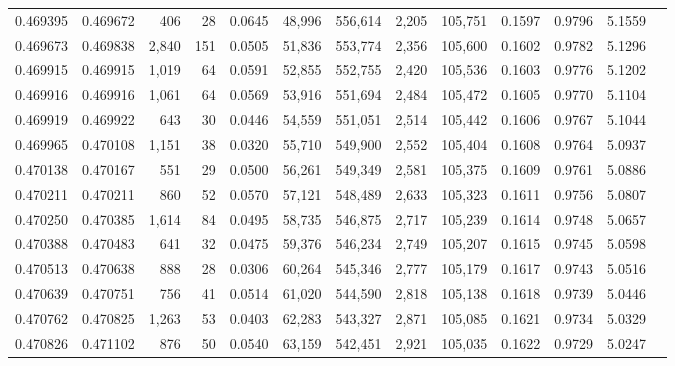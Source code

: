 \begin{tabular}{rrrrrrrrrrrrr}
0.469395 & 0.469672 &   406 &    28 &                                     0.0645 &  48,996 & 556,614 &   2,205 & 105,751 & 0.1597 & 0.9796 & 5.1559 \\
0.469673 & 0.469838 & 2,840 &   151 &                                     0.0505 &  51,836 & 553,774 &   2,356 & 105,600 & 0.1602 & 0.9782 & 5.1296 \\
0.469915 & 0.469915 & 1,019 &    64 &                                     0.0591 &  52,855 & 552,755 &   2,420 & 105,536 & 0.1603 & 0.9776 & 5.1202 \\
0.469916 & 0.469916 & 1,061 &    64 &                                     0.0569 &  53,916 & 551,694 &   2,484 & 105,472 & 0.1605 & 0.9770 & 5.1104 \\
0.469919 & 0.469922 &   643 &    30 &                                     0.0446 &  54,559 & 551,051 &   2,514 & 105,442 & 0.1606 & 0.9767 & 5.1044 \\
0.469965 & 0.470108 & 1,151 &    38 &                                     0.0320 &  55,710 & 549,900 &   2,552 & 105,404 & 0.1608 & 0.9764 & 5.0937 \\
0.470138 & 0.470167 &   551 &    29 &                                     0.0500 &  56,261 & 549,349 &   2,581 & 105,375 & 0.1609 & 0.9761 & 5.0886 \\
0.470211 & 0.470211 &   860 &    52 &                                     0.0570 &  57,121 & 548,489 &   2,633 & 105,323 & 0.1611 & 0.9756 & 5.0807 \\
0.470250 & 0.470385 & 1,614 &    84 &                                     0.0495 &  58,735 & 546,875 &   2,717 & 105,239 & 0.1614 & 0.9748 & 5.0657 \\
0.470388 & 0.470483 &   641 &    32 &                                     0.0475 &  59,376 & 546,234 &   2,749 & 105,207 & 0.1615 & 0.9745 & 5.0598 \\
0.470513 & 0.470638 &   888 &    28 &                                     0.0306 &  60,264 & 545,346 &   2,777 & 105,179 & 0.1617 & 0.9743 & 5.0516 \\
0.470639 & 0.470751 &   756 &    41 &                                     0.0514 &  61,020 & 544,590 &   2,818 & 105,138 & 0.1618 & 0.9739 & 5.0446 \\
0.470762 & 0.470825 & 1,263 &    53 &                                     0.0403 &  62,283 & 543,327 &   2,871 & 105,085 & 0.1621 & 0.9734 & 5.0329 \\
0.470826 & 0.471102 &   876 &    50 &                                     0.0540 &  63,159 & 542,451 &   2,921 & 105,035 & 0.1622 & 0.9729 & 5.0247 \\

\end{tabular}
